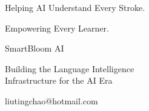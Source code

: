 \begin{frame}[plain]

\vfill

\begin{center}

{\SBFontTitle\fontsize{22}{28}\selectfont\color{SBPrimary}
Helping AI Understand Every Stroke.
}

\vspace{0.30cm}

{\SBFontTitle\fontsize{22}{28}\selectfont\color{SBPrimary}
Empowering Every Learner.
}

\vspace{0.90cm}

{\SBFontTitle\fontsize{28}{34}\selectfont\color{SBText}
SmartBloom AI
}

\vspace{0.35cm}

{\SBFontTitle\fontsize{16}{20}\selectfont\color{SBText}
Building the Language Intelligence\\[0.12cm]
Infrastructure for the AI Era
}

\vspace{0.90cm}

{\SBFontBody\fontsize{11}{13}\selectfont\color{SBGray}
liutingchao@hotmail.com
}

\end{center}

\vfill

\end{frame}
